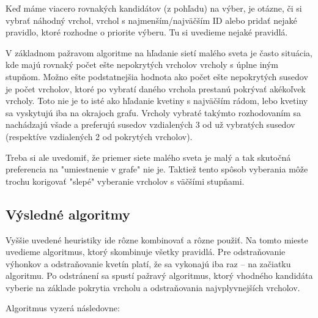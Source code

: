Keď máme viacero rovnakých kandidátov (z pohľadu) na výber, je otázne, či si 
vybrať náhodný vrchol, vrchol s najmenším/najväčším ID alebo pridať nejaké 
pravidlo, ktoré rozhodne o priorite výberu. Tu si uvedieme nejaké pravidlá.

V základnom pažravom algoritme na hľadanie sietí malého sveta je často 
situácia, kde majú rovnaký počet ešte nepokrytých vrcholov vrcholy s úplne 
iným stupňom. Možno ešte podstatnejšia hodnota ako počet ešte nepokrytých 
susedov je počet vrcholov, ktoré po vybratí daného vrchola prestanú pokrývať 
akékoľvek vrcholy. Toto nie je to isté ako hľadanie kvetiny s najväčším rádom, 
lebo kvetiny sa vyskytujú iba na okrajoch grafu. Vrcholy vybraté takýmto 
rozhodovaním sa nachádzajú všade a preferujú susedov vzdialených 3 od už 
vybratých susedov (respektíve vzdialených 2 od pokrytých vrcholov). 

Treba si ale uvedomiť, že priemer siete malého sveta je malý a tak skutočná 
preferencia na "umiestnenie v grafe" nie je. Taktiež tento spôsob vyberania 
môže trochu korigovať "slepé" vyberanie vrcholov s väčšími stupňami.

\subsection{Výsledné algoritmy}

Vyššie uvedené heuristiky ide rôzne kombinovať a rôzne použiť. Na tomto mieste 
uvedieme algoritmus, ktorý skombinuje všetky pravidlá. Pre odstraňovanie 
výhonkov a odstraňovanie kvetín platí, že sa vykonajú iba raz -- na začiatku 
algoritmu. Po odstránení sa spustí pažravý algoritmus, ktorý vhodného kandidáta 
vyberie na základe pokrytia vrcholu a odstraňovania najvplyvnejších vrcholov.

Algoritmus vyzerá následovne:

